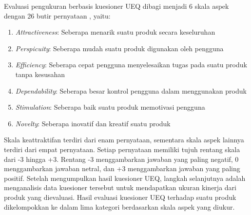 Evaluasi pengukuran berbasis kuesioner UEQ dibagi menjadi 6 skala aspek 
dengan 26 butir pernyataan , yaitu:
\begin{enumerate}
	\item \textit{Attractiveness}: Seberapa menarik suatu produk secara keseluruhan 
	\item \textit{Perspicuity}:  Seberapa mudah suatu produk digunakan oleh pengguna 
	\item \textit{Efficiency}: Seberapa cepat pengguna menyelesaikan tugas pada suatu produk tanpa kesusahan 
	\item \textit{Dependability}: Seberapa besar kontrol pengguna dalam menggunakan produk  
	\item \textit{Stimulation}: Seberapa baik suatu produk memotivasi pengguna 
	\item \textit{Novelty}: Seberapa inovatif dan kreatif suatu produk 
\end{enumerate}
Skala keattraktifan terdiri dari enam pernyataan, sementara skala aspek lainnya terdiri dari empat pernyataan. Setiap pernyataan memiliki tujuh rentang skala dari -3 hingga +3. Rentang -3 menggambarkan jawaban yang paling negatif, 0 menggambarkan jawaban netral, dan +3 menggambarkan jawaban yang paling positif.
Setelah mengumpulkan hasil kuesioner UEQ, langkah selanjutnya adalah menganalisis data kuesioner tersebut untuk mendapatkan ukuran kinerja dari produk yang dievaluasi. Hasil evaluasi kuesioner UEQ terhadap suatu produk dikelompokkan ke dalam lima kategori berdasarkan skala aspek yang diukur.

